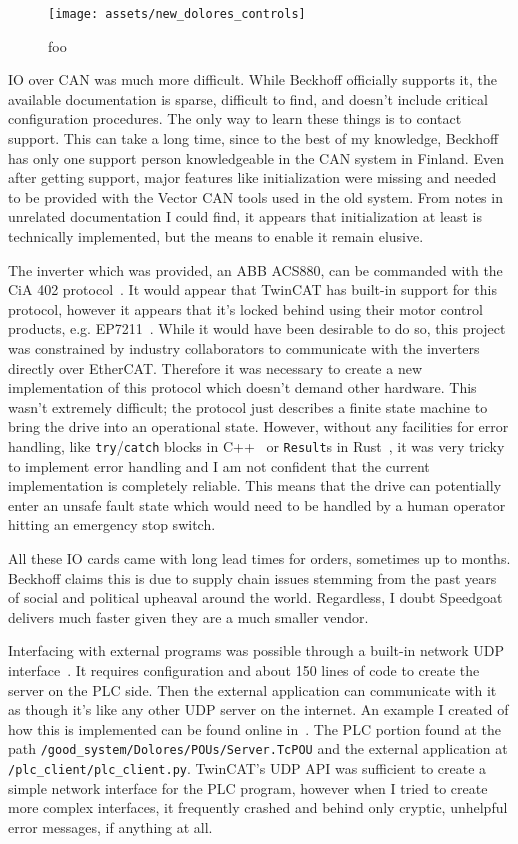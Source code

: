 \documentclass[english,12pt,a4paper,pdftex,eng,utf8]{aaltothesis}
\begin{document}
\begin{figure}[h]
	\centering
	\texttt{[image: assets/new\_dolores\_controls]}
	\caption{foo}\label{fig:dolores_new_system}
\end{figure}

IO over CAN was much more difficult.  While Beckhoff officially supports it, the available documentation is sparse, difficult to find, and doesn't include critical configuration procedures.  The only way to learn these things is to contact support.  This can take a long time, since to the best of my knowledge, Beckhoff has only one support person knowledgeable in the CAN system in Finland.  Even after getting support, major features like initialization were missing and needed to be provided with the Vector CAN tools used in the old system.  From notes in unrelated documentation I could find, it appears that initialization at least is technically implemented, but the means to enable it remain elusive.

The inverter which was provided, an ABB ACS880, can be commanded with the CiA 402 protocol~\cite{ACS880, CiA402}.  It would appear that TwinCAT has built-in support for this protocol, however it appears that it's locked behind using their motor control products, e.g. EP7211~\cite{EP7211}.  While it would have been desirable to do so, this project was constrained by industry collaborators to communicate with the inverters directly over EtherCAT.  Therefore it was necessary to create a new implementation of this protocol which doesn't demand other hardware.  This wasn't extremely difficult; the protocol just describes a finite state machine to bring the drive into an operational state.  However, without any facilities for error handling, like \verb|try|/\verb|catch| blocks in C++~\cite{CppTryCatch} or \verb|Result|s in Rust~\cite{RustResult}, it was very tricky to implement error handling and I am not confident that the current implementation is completely reliable.  This means that the drive can potentially enter an unsafe fault state which would need to be handled by a human operator hitting an emergency stop switch.

All these IO cards came with long lead times for orders, sometimes up to months.  Beckhoff claims this is due to supply chain issues stemming from the past years of social and political upheaval around the world.  Regardless, I doubt Speedgoat delivers much faster given they are a much smaller vendor.

Interfacing with external programs was possible through a built-in network UDP interface~\cite{BeckhoffTcpUdpRealtime}.  It requires configuration and about 150 lines of code to create the server on the PLC side.  Then the external application can communicate with it as though it's like any other UDP server on the internet.  An example I created of how this is implemented can be found online in~\cite{PorterGoodPlc}.  The PLC portion found at the path \verb|/good_system/Dolores/POUs/Server.TcPOU| and the external application at \verb|/plc_client/plc_client.py|.  TwinCAT's UDP API was sufficient to create a simple network interface for the PLC program, however when I tried to create more complex interfaces, it frequently crashed and behind only cryptic, unhelpful error messages, if anything at all.
\end{document}
